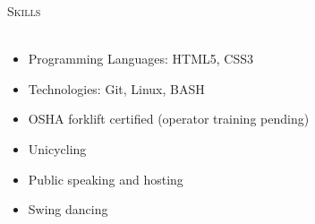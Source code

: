 \documentclass[a4paper]{article}
\newcommand{\lineunder} {
    \vspace*{-8pt} \\
    \hspace*{-18pt} \hrulefill \\
}
\newcommand{\header} [1] {
    {\hspace*{-18pt}\vspace*{6pt} \textsc{#1}}
    \vspace*{-6pt} \lineunder
}
\begin{document}
	\header{Skills}
	\begin{itemize} \itemsep 1pt
		\item Programming Languages: \hspace{2mm} HTML5, CSS3 \\
		\item Technologies:         \hspace{21mm}   Git, Linux, BASH \\
		\item OSHA forklift certified (operator training pending) \\
		\item Unicycling \\
		\item Public speaking and hosting \\
		\item Swing dancing \\
	\end{itemize}




	
	
	
\end{document}
